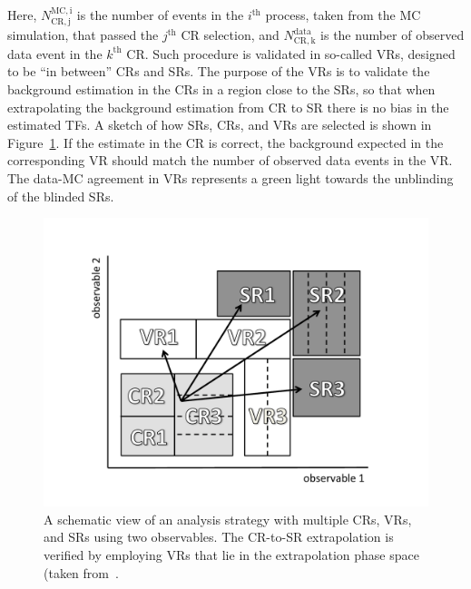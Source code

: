 		\noindent Here, $N_{\mathrm{CR,j}}^{\mathrm{MC,i}}$ is the number of events in the $i^{\mathrm{th}}$ process, taken from the \ac{MC} simulation, that passed the $j^{\mathrm{th}}$ CR selection, and $N_{\mathrm{CR,k}}^{\mathrm{data}}$ is the number of observed data event in the $k^{\mathrm{th}}$ \ac{CR}. Such procedure is validated in so-called \acp{VR}, designed to be ``in between'' \acp{CR} and \acp{SR}. The purpose of the \acp{VR} is to validate the background estimation in the \acp{CR} in a region close to the \acp{SR}, so that when extrapolating the background estimation from \ac{CR} to \ac{SR} there is no bias in the estimated \acp{TF}. A sketch of how \acp{SR}, \acp{CR}, and \acp{VR} are selected is shown in Figure~\ref{fig:extrapolation}. If the estimate in the \ac{CR} is correct, the background expected in the corresponding \ac{VR} should match the number of observed data events in the \ac{VR}. The data-\ac{MC} agreement in \acp{VR} represents a green light towards the unblinding of the blinded \acp{SR}.

		\begin{figure}[!htb]
		  \begin{center}
		   \includegraphics[width=\textwidth]{figures/stop/cartoon_CRVRSR_bw}
		   \caption{A schematic view of an analysis strategy with multiple \acp{CR}, \acp{VR}, and \acp{SR} using two observables. The \ac{CR}-to-\ac{SR} extrapolation is verified by employing \acp{VR} that lie in the extrapolation phase space (taken from~\cite{histfitter}.}
		   \label{fig:extrapolation}
		  \end{center}
		\end{figure}

